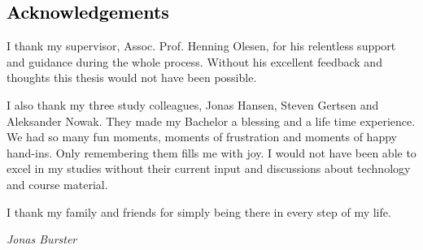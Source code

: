 {\textcolor{black}{\section*{\textcolor{black}{Acknowledgements}}}}
\noindent I thank my supervisor, Assoc. Prof. Henning Olesen, for his relentless support and guidance during the whole process.
Without his excellent feedback and thoughts this thesis would not have been possible.

\hspace{1.5cm}

\noindent I also thank my three study colleagues, Jonas Hansen, Steven Gertsen and Aleksander Nowak. They made my Bachelor a blessing and a life time experience. We had so many fun moments, moments of frustration and moments of happy hand-ins. Only remembering them fills me with joy. I would not have been able to excel in my studies without their current input and discussions about technology and course material. 

\hspace{1.5cm}

\noindent I thank my family and friends for simply being there in every step of my life.

\hspace{1.5cm}

\noindent \textit{Jonas Burster}